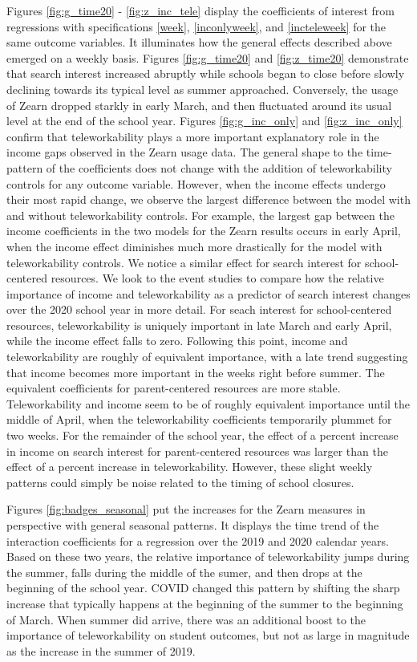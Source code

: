     Figures \ref{fig:g_time20} - \ref{fig:z_inc_tele} display the coefficients of interest from regressions with specifications \ref{week}, \ref{inconlyweek}, and \ref{incteleweek} for the same outcome variables.
    It illuminates how the general effects described above emerged on a weekly basis.
    Figures \ref{fig:g_time20} and \ref{fig:z_time20} demonstrate that search interest increased abruptly while schools began to close before slowly declining towards its typical level as summer approached.
    Conversely, the usage of Zearn dropped starkly in early March, and then fluctuated around its usual level at the end of the school year.
    Figures \ref{fig:g_inc_only} and \ref{fig:z_inc_only} confirm that teleworkability plays a more important explanatory role in the income gaps observed in the Zearn usage data.
    The general shape to the time-pattern of the coefficients does not change with the addition of teleworkability controls for any outcome variable.
    However, when the income effects undergo their most rapid change, we observe the largest difference between the model with and without teleworkability controls.
    For example, the largest gap between the income coefficients in the two models for the Zearn results occurs in early April, when the income effect diminishes much more drastically for the model with teleworkability controls.
    We notice a similar effect for search interest for school-centered resources.
\fi
     We look to the event studies to compare how the relative importance of income and teleworkability as a predictor of search interest changes over the 2020 school year in more detail.
    For seach interest for school-centered resources, teleworkability is uniquely important in late March and early April, while the income effect falls to zero.
    Following this point, income and teleworkability are roughly of equivalent importance, with a late trend suggesting that income becomes more important in the weeks right before summer.
    The equivalent coefficients for parent-centered resources are more stable.
    Teleworkability and income seem to be of roughly equivalent importance until the middle of April, when the teleworkability coefficients temporarily plummet for two weeks. For the remainder of the school year, the effect of a percent increase in income on search interest for parent-centered resources was larger than the effect of a percent increase in teleworkability.
    However, these slight weekly patterns could simply be noise related to the timing of school closures.


    Figures \ref{fig:badges_seasonal} put the increases for the Zearn measures in perspective with general seasonal patterns.
    It displays the time trend of the interaction coefficients for a regression over the 2019 and 2020 calendar years.
    Based on these two years, the relative importance of teleworkability jumps during the summer, falls during the middle of the sumer, and then drops at the beginning of the school year.
    COVID changed this pattern by shifting the sharp increase that typically happens at the beginning of the summer to the beginning of March.
    When summer did arrive, there was an additional boost to the importance of teleworkability on student outcomes, but not as large in magnitude as the increase in the summer of 2019.

